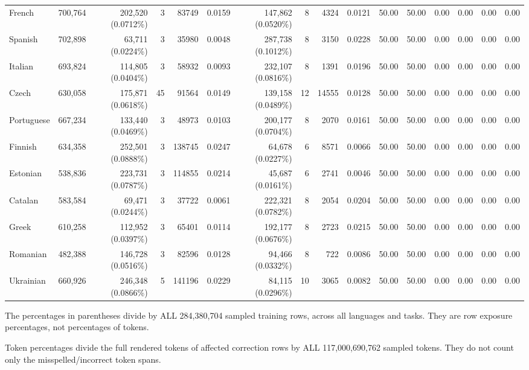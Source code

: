 \documentclass[10pt]{article}
\begin{document}
{\begin{tabular}{lrrrrrrrrrrrrrrr}
French & 700,764 & 202,520 (0.0712\%) & 3 & 83749 & 0.0159 & 147,862 (0.0520\%) & 8 & 4324 & 0.0121 & 50.00 & 50.00 & 0.00 & 0.00 & 0.00 & 0.00 \\
Spanish & 702,898 & 63,711 (0.0224\%) & 3 & 35980 & 0.0048 & 287,738 (0.1012\%) & 8 & 3150 & 0.0228 & 50.00 & 50.00 & 0.00 & 0.00 & 0.00 & 0.00 \\
Italian & 693,824 & 114,805 (0.0404\%) & 3 & 58932 & 0.0093 & 232,107 (0.0816\%) & 8 & 1391 & 0.0196 & 50.00 & 50.00 & 0.00 & 0.00 & 0.00 & 0.00 \\
Czech & 630,058 & 175,871 (0.0618\%) & 45 & 91564 & 0.0149 & 139,158 (0.0489\%) & 12 & 14555 & 0.0128 & 50.00 & 50.00 & 0.00 & 0.00 & 0.00 & 0.00 \\
Portuguese & 667,234 & 133,440 (0.0469\%) & 3 & 48973 & 0.0103 & 200,177 (0.0704\%) & 8 & 2070 & 0.0161 & 50.00 & 50.00 & 0.00 & 0.00 & 0.00 & 0.00 \\
Finnish & 634,358 & 252,501 (0.0888\%) & 3 & 138745 & 0.0247 & 64,678 (0.0227\%) & 6 & 8571 & 0.0066 & 50.00 & 50.00 & 0.00 & 0.00 & 0.00 & 0.00 \\
Estonian & 538,836 & 223,731 (0.0787\%) & 3 & 114855 & 0.0214 & 45,687 (0.0161\%) & 6 & 2741 & 0.0046 & 50.00 & 50.00 & 0.00 & 0.00 & 0.00 & 0.00 \\
Catalan & 583,584 & 69,471 (0.0244\%) & 3 & 37722 & 0.0061 & 222,321 (0.0782\%) & 8 & 2054 & 0.0204 & 50.00 & 50.00 & 0.00 & 0.00 & 0.00 & 0.00 \\
Greek & 610,258 & 112,952 (0.0397\%) & 3 & 65401 & 0.0114 & 192,177 (0.0676\%) & 8 & 2723 & 0.0215 & 50.00 & 50.00 & 0.00 & 0.00 & 0.00 & 0.00 \\
Romanian & 482,388 & 146,728 (0.0516\%) & 3 & 82596 & 0.0128 & 94,466 (0.0332\%) & 8 & 722 & 0.0086 & 50.00 & 50.00 & 0.00 & 0.00 & 0.00 & 0.00 \\
Ukrainian & 660,926 & 246,348 (0.0866\%) & 5 & 141196 & 0.0229 & 84,115 (0.0296\%) & 10 & 3065 & 0.0082 & 50.00 & 50.00 & 0.00 & 0.00 & 0.00 & 0.00 \\
\bottomrule\end{tabular}}
\par\bigskip
The percentages in parentheses divide by ALL 284,380,704 sampled training rows, across all languages and tasks. They are row exposure percentages, not percentages of tokens.\par\smallskip
Token percentages divide the full rendered tokens of affected correction rows by ALL 117,000,690,762 sampled tokens. They do not count only the misspelled/incorrect token spans.\par\smallskip
\end{document}
